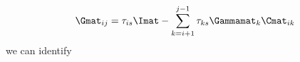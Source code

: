 \begin{equation}
  \Gmat_{i j} = \tau_{i s} \Imat - \sum\limits_{k = i + 1}^{j-1}\tau_{k s }\Gammamat_k\Cmat_{i k} 
\end{equation}
we can identify